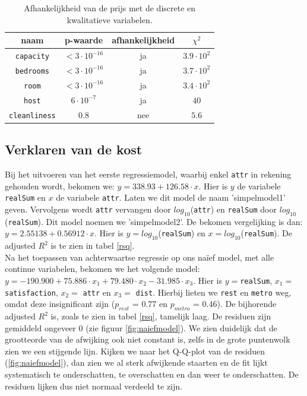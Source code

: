 \documentclass[a4paper]{kulakarticle}
\begin{document}
	\begin{table}[h]
		\centering
		\begin{tabular}{c|c|c|c }
			naam & p-waarde & afhankelijkheid & $\chi ^2$\\
			\hline
			\hline
			\verb*|capacity| & $< 3 \cdot 10^{-16}$ & ja& $3.9 \cdot 10^{2}$ \\ 
			\verb*|bedrooms| & $< 3 \cdot 10^{-16}$ & ja& $3.7  \cdot 10^{2}$ \\
			\verb*|room| & $< 3 \cdot 10^{-16}$ & ja& $ 3.4 \cdot 10^{2}$ \\
			\verb*|host| & $ 6 \cdot 10^{-7}$ & ja& $40$ \\
			\verb*|cleanliness| & $0.8$ &nee& $5.6$ \\
		\end{tabular}
		\caption{Afhankelijkheid van de prijs met de discrete en kwalitatieve variabelen.}
		\label{discrete variabelen afhankelijkheid}
	\end{table}
	
	\subsection{Verklaren van de kost}
	
	Bij het uitvoeren van het eerste regressiemodel, waarbij enkel \verb*|attr| in rekening gehouden wordt, bekomen we: 
    $ y = 338.93 + 126.58\cdot x$. Hier is $y$ de variabele \verb*|realSum| en $x$ de variabele \verb*|attr|. Laten we dit model de naam 'simpelmodel1' geven. Vervolgens wordt \verb*|attr| vervangen door $log_{10}$(\verb*|attr|) en \verb*|realSum| door $log_{10}$(\verb*|realSum|). Dit model noemen we 'simpelmodel2'. De bekomen vergelijking is dan: $ y = 2.55138 + 0.56912\cdot x$. Hier is $y = log_{10}$(\verb*|realSum|) en $x = log_{10}$(\verb*|realSum|). De adjusted $R^2$ is te zien in tabel \ref{rsq}.\\
    
	Na het toepassen van achterwaartse regressie op ons naïef model, met alle continue variabelen, bekomen we het volgende model: $y = -190.900 + 75.886\cdot x_1 + 79.480\cdot x_2 -31.985\cdot x_3$. Hier is $y =$\verb*|realSum|, $x_1 = $ \verb*|satisfaction|, $x_2 =$ \verb*|attr| en $x_3 =$ \verb*|dist|. Hierbij lieten we \verb*|rest| en \verb*|metro| weg, omdat deze insignificant zijn ($p_{rest}$ = 0.77 en $p_{metro}$ = 0.46). De bijhorende adjusted $R^2$ is, zoals te zien in tabel \ref{rsq}, tamelijk laag. De residuen zijn gemiddeld ongeveer 0 (zie figuur \ref{fig:naiefmodel}). We zien duidelijk dat de grootteorde van de afwijking ook niet constant is, zelfs in de grote puntenwolk zien we een stijgende lijn. Kijken we naar het Q-Q-plot van de residuen (\ref{fig:naiefmodel}), dan zien we al sterk afwijkende staarten en de fit lijkt systematisch te onderschatten, te overschatten en dan weer te onderschatten. De residuen lijken dus niet normaal verdeeld te zijn. \\
	
\end{document}

